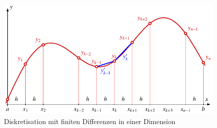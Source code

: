 %
%
%
\begin{figure}
\centering
\includegraphics{chapters/090-pdenumerik/images/1d.pdf}
\caption{Diskretisation mit finiten Differenzen in einer Dimension
\label{buch:pdenumerik:fdm:fig:1d}}
\end{figure}

